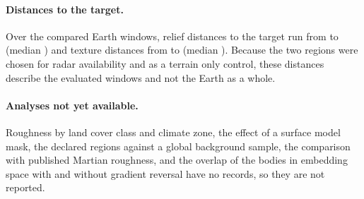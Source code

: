 \paragraph{Distances to the target.} Over the \ComparedCount{} compared Earth windows, relief
distances to the target run from \ReliefDistanceMin{} to \ReliefDistanceMax{} (median
\ReliefDistanceMedian) and texture distances from \TextureDistanceMin{} to \TextureDistanceMax{}
(median \TextureDistanceMedian). Because the two regions were chosen for radar availability and as
a terrain only control, these distances describe the evaluated windows and not the Earth as a
whole.

\paragraph{Analyses not yet available.} Roughness by land cover class and climate zone, the effect of a surface model mask, the declared regions against a global background sample, the comparison with published Martian roughness, and the overlap of the bodies in embedding space with and without gradient reversal have no records, so they are not reported.
